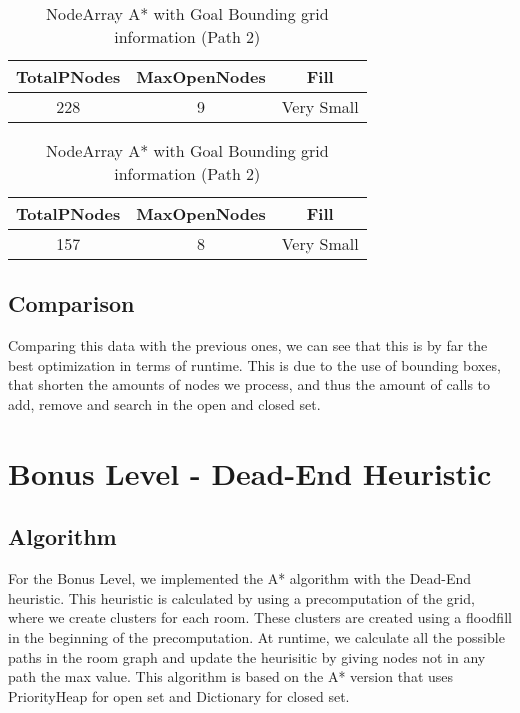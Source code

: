 \documentclass{article}
\begin{document}
  \begin{table}[h!]
    \parbox{.45\linewidth}{
        \centering
        \caption{NodeArray A* with Goal Bounding grid information (Path 1)}
        \label{tab:tableGoalBoundingGrid1}
        \begin{tabular}{c|c|c}
          \textbf{TotalPNodes} & \textbf{MaxOpenNodes} & \textbf{Fill}\\
          \hline
          228 & 9 & Very Small\\
        \end{tabular}
    }
    \hfil
    \parbox{.45\linewidth}{
        \centering
        \caption{NodeArray A* with Goal Bounding grid information (Path 2)}
        \label{tab:tableGoalBoundingGrid2}
        \begin{tabular}{c|c|c}
          \textbf{TotalPNodes} & \textbf{MaxOpenNodes} & \textbf{Fill}\\
          \hline
          157 & 8 & Very Small\\
        \end{tabular}
    }
  \end{table}

  \subsection{Comparison}
  Comparing this data with the previous ones, we can see that this is by far the best optimization in terms of runtime. This is due to the use of bounding boxes,
  that shorten the amounts of nodes we process, and thus the amount of calls to add, remove and search in the open and closed set.\\

  \section{Bonus Level - Dead-End Heuristic}

  \subsection{Algorithm}
  For the Bonus Level, we implemented the A* algorithm with the Dead-End heuristic. This heuristic is calculated by using a precomputation of the grid, where we
  create clusters for each room. These clusters are created using a floodfill in the beginning of the precomputation. At runtime, we calculate all the possible paths 
  in the room graph and update the heurisitic by giving nodes not in any path the max value. This algorithm is based on the A* version that uses PriorityHeap for 
  open set and Dictionary for closed set.\\
  
\end{document}
